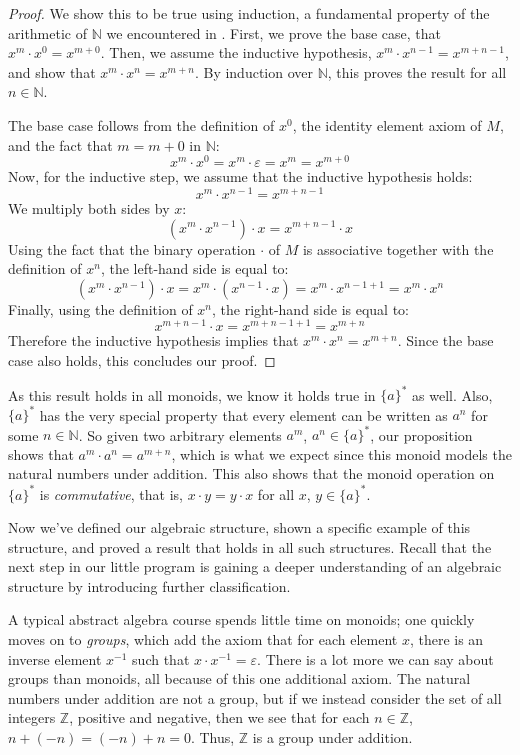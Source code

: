 \documentclass[../generics]{subfiles}
\begin{document}
\begin{proof}
We show this to be true using induction, a fundamental property of the arithmetic of $\mathbb{N}$ we encountered in . First, we prove the base case, that $x^m\cdot x^0=x^{m+0}$. Then, we assume the inductive hypothesis, $x^m\cdot x^{n-1}=x^{m+n-1}$, and show that $x^m\cdot x^n=x^{m+n}$. By induction over $\mathbb{N}$, this proves the result for all $n\in\mathbb{N}$.

The base case follows from the definition of $x^0$, the identity element axiom of $M$, and the fact that $m=m+0$ in $\mathbb{N}$:
\[x^m\cdot x^0=x^m\cdot\varepsilon=x^m=x^{m+0}\]
Now, for the inductive step, we assume that the inductive hypothesis holds:
\[x^m\cdot x^{n-1}=x^{m+n-1}\]
We multiply both sides by $x$:
\[(x^m\cdot x^{n-1})\cdot x =x^{m+n-1}\cdot x\]
Using the fact that the binary operation $\cdot$ of $M$ is associative together with the definition of $x^n$, the left-hand side is equal to:
\[
(x^m\cdot x^{n-1})\cdot x = x^m\cdot (x^{n-1}\cdot x) = x^m\cdot x^{n-1+1}=x^m\cdot x^n
\]
Finally, using the definition of $x^n$, the right-hand side is equal to:
\[
x^{m+n-1}\cdot x = x^{m+n-1+1}=x^{m+n}
\]
Therefore the inductive hypothesis implies that $x^m\cdot x^n=x^{m+n}$. Since the base case also holds, this concludes our proof.
\end{proof}
As this result holds in all monoids, we know it holds true in $\{a\}^*$ as well. Also, $\{a\}^*$ has the very special property that every element can be written as $a^n$ for some $n\in\mathbb{N}$. So given two arbitrary elements $a^m$, $a^n\in \{a\}^*$, our proposition shows that $a^m\cdot a^n=a^{m+n}$, which is what we expect since this monoid models the natural numbers under addition. This also shows that the monoid operation on $\{a\}^*$ is \emph{commutative}, that is, $x\cdot y=y\cdot x$ for all $x$, $y\in\{a\}^*$.

\medskip
Now we've defined our algebraic structure, shown a specific example of this structure, and proved a result that holds in all such structures. Recall that the next step in our little program is gaining a deeper understanding of an algebraic structure by introducing further classification.

A typical abstract algebra course spends little time on monoids; one quickly moves on to \emph{groups}, which add the axiom that for each element $x$, there is an inverse element $x^{-1}$ such that $x\cdot x^{-1}=\varepsilon$. There is a lot more we can say about groups than monoids, all because of this one additional axiom. The natural numbers under addition are not a group, but if we instead consider the set of all integers $\mathbb{Z}$, positive and negative, then we see that for each $n\in\mathbb{Z}$, $n+(-n)=(-n)+n=0$. Thus, $\mathbb{Z}$ is a group under addition.
\end{document}
